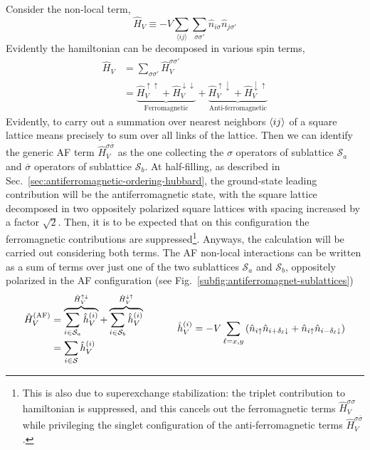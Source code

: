 Consider the non-local term,
\begin{equation}\label{eq:extended-hubbard-nonlocal-interaction}
	\hat H_V \equiv - V \sum_{\langle ij \rangle} \sum_{\sigma \sigma'} \hat n_{i\sigma} \hat n_{j\sigma'}
\end{equation}
Evidently the hamiltonian can be decomposed in various spin terms,
\[
\begin{aligned}
	\hat H_V &= \sum_{\sigma \sigma'} \hat H_V^{\sigma\sigma'} \\
	&= \underbrace{
		\hat H_V^{\uparrow\uparrow} + \hat H_V^{\downarrow\downarrow}
	}_\text{Ferromagnetic} + \underbrace{
		\hat H_V^{\uparrow\downarrow} + \hat H_V^{\downarrow\uparrow}
	}_\text{Anti-ferromagnetic}
\end{aligned}
\]
Evidently, to carry out a summation over nearest neighbors $\ev{ij}$ of a square lattice means precisely to sum over all links of the lattice. Then we can identify the generic AF term $\hat H_V^{\sigma \overline{\sigma}}$ as the one collecting the $\sigma$ operators of sublattice $\mathcal{S}_a$ and $\overline{\sigma}$ operators of sublattice $\mathcal{S}_b$. At half-filling, as described in Sec.~\ref{sec:antiferromagnetic-ordering-hubbard}, the ground-state leading contribution will be the antiferromagnetic state, with the square lattice decomposed in two oppositely polarized square lattices with spacing increased by a factor $\sqrt{2}$. Then, it is to be expected that on this configuration the ferromagnetic contributions are suppressed\footnote{
	This is also due to superexchange stabilization: the triplet contribution to hamiltonian is suppressed, and this cancels out the ferromagnetic terms $\hat H_V^{\sigma\sigma}$ while privileging the singlet configuration of the anti-ferromagnetic terms $\hat H_V^{\sigma\overline{\sigma}}$.
}. Anyways, the calculation will be carried out considering both terms.
The AF non-local interactions can be written as a sum of terms over just one of the two sublattices $\mathcal{S}_a$ and $\mathcal{S}_b$, oppositely polarized in the AF configuration (see Fig.~\ref{subfig:antiferromagnet-sublattices})
\[
	\begin{aligned}
		\hat H_V^{(\mathrm{AF})} &= \overbrace{
			\sum_{i \in \mathcal{S}_a} \hat h_V^{(i)}
		}^{\hat H_V^{\uparrow\downarrow}} + \overbrace{
			\sum_{i \in \mathcal{S}_b} \hat h_V^{(i)}
		}^{\hat H_V^{\downarrow\uparrow}} \\
		&= \sum_{i \in \mathcal{S}} \hat h_V^{(i)}
	\end{aligned}
	\hspace{0.1\textwidth}
	\hat h_V^{(i)} = -V \sum_{\ell = x,y} \left(
		\hat n_{i\uparrow} \hat n_{i+\delta_\ell \downarrow} + \hat n_{i\uparrow} \hat n_{i-\delta_\ell \downarrow} 
	\right) 
\]
